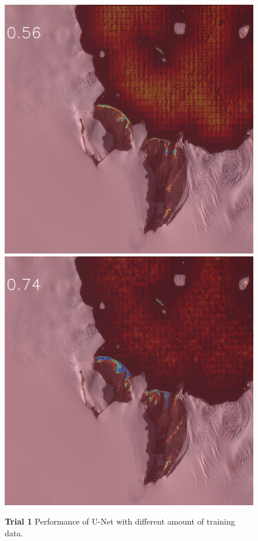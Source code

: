\begin{figure}[h]
\includegraphics[width=\subFigx]{./fig/datagrow/MSE_single_unet_train_0_3.txt_bias-1_bs128_do0.1e25/WV03_20170217064537_10400100297FEA00_17FEB17064537-M1BS-057107305010_01_P001_u08rf3031.png}
\includegraphics[width=\subFigx]{./fig/datagrow/MSE_single_unet_train_0_4.txt_bias-1_bs128_do0.1e25/WV03_20170217064537_10400100297FEA00_17FEB17064537-M1BS-057107305010_01_P001_u08rf3031.png}



\caption{{{\bf Trial 1} Performance of U-Net with different amount of training data.}}
\label{fig:dgrow1}
\end{figure}

